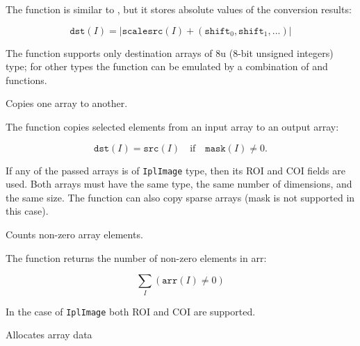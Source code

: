 The function is similar to , but it stores absolute values of the conversion results:

\[
\texttt{dst}(I) = |\texttt{scale} \texttt{src}(I) + (\texttt{shift}_0,\texttt{shift}_1,...)|
\]

The function supports only destination arrays of 8u (8-bit unsigned integers) type; for other types the function can be emulated by a combination of  and  functions.

Copies one array to another.


\begin{description}
\end{description}


The function copies selected elements from an input array to an output array:

\[
\texttt{dst}(I)=\texttt{src}(I) \quad \text{if} \quad \texttt{mask}(I) \ne 0.
\]

If any of the passed arrays is of \texttt{IplImage} type, then its ROI
and COI fields are used. Both arrays must have the same type, the same
number of dimensions, and the same size. The function can also copy sparse
arrays (mask is not supported in this case).

Counts non-zero array elements.


\begin{description}
\end{description}


The function returns the number of non-zero elements in arr:

\[ \sum_I (\texttt{arr}(I) \ne 0) \]

In the case of \texttt{IplImage} both ROI and COI are supported.


Allocates array data


